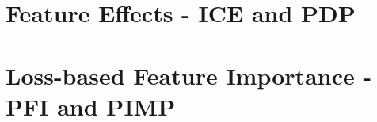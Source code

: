 \documentclass[11pt,compress,t,notes=noshow, aspectratio=169, xcolor=table]{beamer}
\begin{document}
\section{Feature Effects - ICE and PDP}

%



%

% 

\section{Loss-based Feature Importance - PFI and PIMP}
%


%

%
\end{document}

